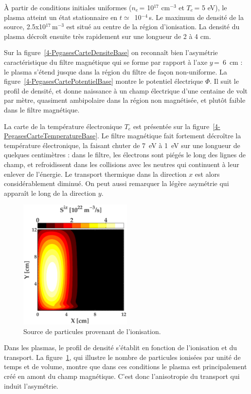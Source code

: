 \begin{refsection}
À partir de conditions initiales uniformes ($n_e\,$= 10$^{17}$ cm$^{-3}$ et
$T_e\,$= 5 eV), le plasma atteint un état stationnaire en $t\simeq\,$
10$^{-4}\,$s.
Le maximum de densité de la source, 2.5x10$^{17}\,$m$^{-3}$ est situé au
centre de la région d'ionisation. La densité du plasma décroît ensuite très
rapidement sur une longueur de 2 à 4 cm. 

Sur la figure~\ref{4-PegasesCarteDensiteBase} on reconnaît bien l'asymétrie
caractéristique du filtre magnétique qui se forme par rapport à l'axe
$y\,$=~6~cm : le plasma s'étend jusque dans la région du
filtre de façon non-uniforme.
La figure~\ref{4-PegasesCartePotentielBase} montre le potentiel
électrique $\Phi$. Il suit le profil de densité, et donne naissance à un champ
électrique d'une centaine de volt par mètre, quasiment ambipolaire dans la
région non magnétisée, et plutôt faible dans le filtre magnétique.

La carte de la température électronique $T_e$ est présentée sur la
figure~\ref{4-PegasesCarteTemperatureBase}. Le filtre magnétique fait fortement
décroître la température électronique, la faisant chuter de 7~eV à 1~eV sur une
longueur de quelques centimètres : dans le filtre, les électrons sont piégés le
long des lignes de champ, et refroidissent dans les collisions avec les neutres
qui continuent à leur enlever de l'énergie. Le transport thermique dans la
direction $x$ est alors considérablement diminué.
On peut aussi remarquer la légère asymétrie qui apparaît le long de la
direction $y$.

\begin{figure}[!htbp]\centering
\includegraphics[height=6.5cm]{figures/4-PegasesCarteSourceBase.eps}
\caption{Source de particules provenant de l'ionisation.}
\label{4-PegasesCarteSourceBase}
\end{figure}

Dans les plasmas, le profil de densité s'établit en fonction de l'ionisation
et du transport. La figure~\ref{4-PegasesCarteSourceBase}, qui illustre le
nombre de particules ionisées par unité de temps et de volume, montre que dans ces
conditions le plasma est principalement créé en amont du champ magnétique.
C'est donc l'anisotropie du transport qui induit l'asymétrie. 


\end{refsection}
